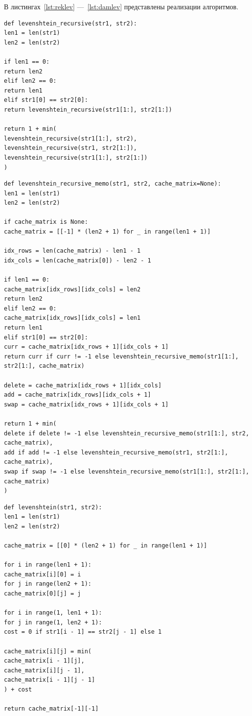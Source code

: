 \documentclass[a4paper, 14pt]{extreport}
\begin{document}
    В листингах~\ref{lst:reklev} ---~\ref{lst:damlev} представлены реализации алгоритмов.

    \begin{lstlisting}[style=python, caption=Рекурсивный алгоритм Левенштейна,label={lst:reklev}]
def levenshtein_recursive(str1, str2):
len1 = len(str1)
len2 = len(str2)

if len1 == 0:
return len2
elif len2 == 0:
return len1
elif str1[0] == str2[0]:
return levenshtein_recursive(str1[1:], str2[1:])

return 1 + min(
levenshtein_recursive(str1[1:], str2),
levenshtein_recursive(str1, str2[1:]),
levenshtein_recursive(str1[1:], str2[1:])
)
    \end{lstlisting}

    \begin{lstlisting}[style=python, caption=Рекурсивный алгоритм Левенштейна с Мемоизацией,label={lst:rekmemlev}]
def levenshtein_recursive_memo(str1, str2, cache_matrix=None):
len1 = len(str1)
len2 = len(str2)

if cache_matrix is None:
cache_matrix = [[-1] * (len2 + 1) for _ in range(len1 + 1)]

idx_rows = len(cache_matrix) - len1 - 1
idx_cols = len(cache_matrix[0]) - len2 - 1

if len1 == 0:
cache_matrix[idx_rows][idx_cols] = len2
return len2
elif len2 == 0:
cache_matrix[idx_rows][idx_cols] = len1
return len1
elif str1[0] == str2[0]:
curr = cache_matrix[idx_rows + 1][idx_cols + 1]
return curr if curr != -1 else levenshtein_recursive_memo(str1[1:], str2[1:], cache_matrix)

delete = cache_matrix[idx_rows + 1][idx_cols]
add = cache_matrix[idx_rows][idx_cols + 1]
swap = cache_matrix[idx_rows + 1][idx_cols + 1]

return 1 + min(
delete if delete != -1 else levenshtein_recursive_memo(str1[1:], str2, cache_matrix),
add if add != -1 else levenshtein_recursive_memo(str1, str2[1:], cache_matrix),
swap if swap != -1 else levenshtein_recursive_memo(str1[1:], str2[1:], cache_matrix)
)
    \end{lstlisting}

    \begin{lstlisting}[style=python, caption=Нерекурсивный алгоритм Левенштейна,label={lst:lev}]
def levenshtein(str1, str2):
len1 = len(str1)
len2 = len(str2)

cache_matrix = [[0] * (len2 + 1) for _ in range(len1 + 1)]

for i in range(len1 + 1):
cache_matrix[i][0] = i
for j in range(len2 + 1):
cache_matrix[0][j] = j

for i in range(1, len1 + 1):
for j in range(1, len2 + 1):
cost = 0 if str1[i - 1] == str2[j - 1] else 1

cache_matrix[i][j] = min(
cache_matrix[i - 1][j],
cache_matrix[i][j - 1],
cache_matrix[i - 1][j - 1]
) + cost

return cache_matrix[-1][-1]
    \end{lstlisting}
\end{document}
